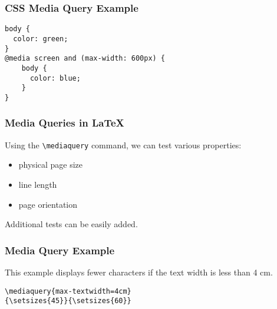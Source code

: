 \begin{frame}[fragile]
\frametitle{CSS Media Query Example}
\begin{verbatim}
body {
  color: green;
}
@media screen and (max-width: 600px) {
    body {
      color: blue;
    }
}
\end{verbatim}
\end{frame}
          
\begin{frame}[fragile]
  \frametitle{Media Queries in \LaTeX}
    Using the \verb|\mediaquery| command, we can test various properties:
  
    \begin{itemize}
  \item physical page size
  \item line length
  \item page orientation
\end{itemize}

Additional tests can be easily added.

\end{frame}

\begin{frame}[fragile]

  \frametitle{Media Query Example}

  This example displays fewer characters if the text width is less than 4 cm.

\begin{verbatim}
\mediaquery{max-textwidth=4cm}
{\setsizes{45}}{\setsizes{60}}
\end{verbatim}
\begin{columns}
  \begin{column}{0.5\textwidth}
\end{column}
  \begin{column}{0.5\textwidth}
\end{column}
\end{columns}

\end{frame}

